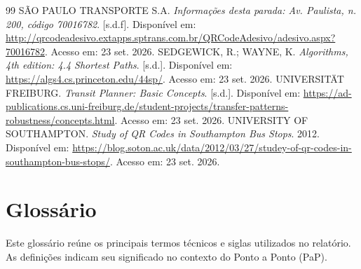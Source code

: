 \documentclass[12pt,oneside,a4paper,brazil]{abntex2}
\begin{document}
\begin{thebibliography}{99}
 SÃO PAULO TRANSPORTE S.A. \textit{Informações desta parada: Av. Paulista, n. 200, código 70016782}. [s.d.f]. Disponível em: \url{http://qrcodeadesivo.extapps.sptrans.com.br/QRCodeAdesivo/adesivo.aspx?70016782}. Acesso em: 23 set. 2026.
 SEDGEWICK, R.; WAYNE, K. \textit{Algorithms, 4th edition: 4.4 Shortest Paths}. [s.d.]. Disponível em: \url{https://algs4.cs.princeton.edu/44sp/}. Acesso em: 23 set. 2026.
 UNIVERSITÄT FREIBURG. \textit{Transit Planner: Basic Concepts}. [s.d.]. Disponível em: \url{https://ad-publications.cs.uni-freiburg.de/student-projects/transfer-patterns-robustness/concepts.html}. Acesso em: 23 set. 2026.
 UNIVERSITY OF SOUTHAMPTON. \textit{Study of QR Codes in Southampton Bus Stops}. 2012. Disponível em: \url{https://blog.soton.ac.uk/data/2012/03/27/studey-of-qr-codes-in-southampton-bus-stops/}. Acesso em: 23 set. 2026.
\end{thebibliography}


\chapter*{Glossário}
\label{sec:glossario}
Este glossário reúne os principais termos técnicos e siglas utilizados no relatório. As definições indicam seu significado no contexto do Ponto a Ponto (PaP).
\end{document}
